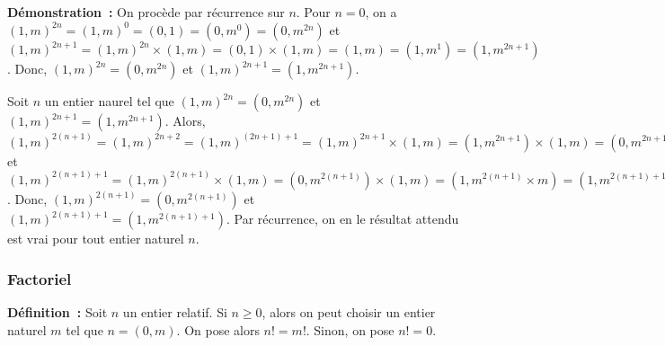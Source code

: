 \noindent\textbf{Démonstration :} On procède par récurrence sur $n$.
    Pour $n = 0$, on a $(1,m)^{2n} = (1,m)^0 = (0,1) = (0,m^0) = (0,m^{2 n})$ et $(1,m)^{2n+1} = (1,m)^{2 n} \times (1,m) = (0,1) \times (1,m) = (1,m) = (1,m^1) = (1,m^{2 n + 1})$. 
    Donc, $(1,m)^{2n} = (0,m^{2 n})$ et $(1,m)^{2n+1} = (1,m^{2 n + 1})$. 
    
    Soit $n$ un entier naurel tel que $(1,m)^{2n} = (0,m^{2 n})$ et $(1,m)^{2n+1} = (1,m^{2 n + 1})$. 
    Alors, $(1,m)^{2(n+1)} = (1,m)^{2n + 2} = (1,m)^{(2n+1)+1} = (1,m)^{2n+1} \times (1,m) = (1, m^{2n+1}) \times (1,m) = (0,m^{2n+1} \times m) = (0, m^{2n+1+1}) = (0, m^{2(n+1)})$ et $(1,m)^{2(n+1)+1} = (1,m)^{2(n+1)} \times (1,m) = (0, m^{2(n+1)}) \times (1,m) = (1,m^{2(n+1)} \times m) = (1, m^{2(n+1)+1})$. 
    Donc, $(1,m)^{2(n+1)} = (0, m^{2(n+1)})$ et $(1,m)^{2(n+1)+1} = (1, m^{2(n+1)+1})$. 
    Par récurrence, on en le résultat attendu est vrai pour tout entier naturel $n$.

   \done 

\subsubsection{Factoriel}

\noindent\textbf{Définition :} Soit $n$ un entier relatif. 
    Si $n \geq 0$, alors on peut choisir un entier naturel $m$ tel que $n = (0,m)$. 
    On pose alors $n! = m!$. 
    Sinon, on pose $n! = 0$.
